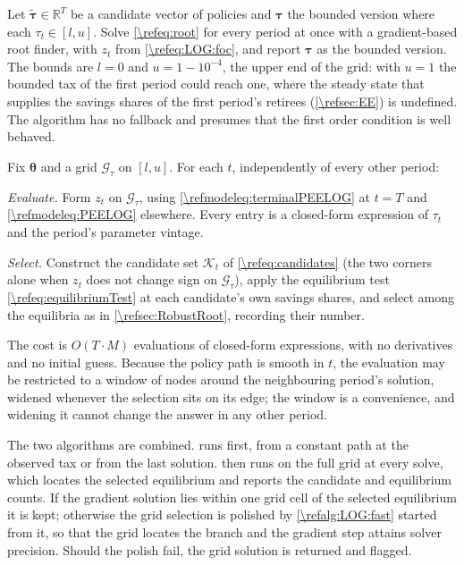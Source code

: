\begin{alg}
\label{\refalg:LOG:fast}
Let $\tilde{\bm{\tau}} \in \mathbb{R}^{T}$ be a candidate vector of policies and $\bm{\tau}$ the bounded version where each $\tau_t \in [l, u]$. Solve \eqref{\refeq:root} for every period at once with a gradient-based root finder, with $z_t$ from \eqref{\refeq:LOG:foc}, and report $\bm{\tau}$ as the bounded version. The bounds are $l = 0$ and $u = 1-10^{-4}$, the upper end of the grid: with $u = 1$ the bounded tax of the first period could reach one, where the steady state that supplies the savings shares of the first period's retirees (\cref{\refsec:EE}) is undefined. The algorithm has no fallback and presumes that the first order condition is well behaved.
\end{alg}

\begin{alg}\label{\refalg:LOG:gridsearch}
Fix $\bm{\theta}$ and a grid $\mathcal{G}_{\tau}$ on $[l,u]$. For each $t$, independently of every other period:

\smallskip\noindent\emph{Evaluate.} Form $z_t$ on $\mathcal{G}_{\tau}$, using \eqref{\refmodeleq:terminalPEELOG} at $t=T$ and \eqref{\refmodeleq:PEELOG} elsewhere. Every entry is a closed-form expression of $\tau_t$ and the period's parameter vintage.

\smallskip\noindent\emph{Select.} Construct the candidate set $\mathcal{K}_t$ of \eqref{\refeq:candidates} (the two corners alone when $z_t$ does not change sign on $\mathcal{G}_{\tau}$), apply the equilibrium test \eqref{\refeq:equilibriumTest} at each candidate's own savings shares, and select among the equilibria as in \cref{\refsec:RobustRoot}, recording their number.

\smallskip
The cost is $O(T\cdot M)$ evaluations of closed-form expressions, with no derivatives and no initial guess. Because the policy path is smooth in $t$, the evaluation may be restricted to a window of nodes around the neighbouring period's solution, widened whenever the selection sits on its edge; the window is a convenience, and widening it cannot change the answer in any other period.
\end{alg}

The two algorithms are combined.  runs first, from a constant path at the observed tax or from the last solution.  then runs on the full grid at every solve, which locates the selected equilibrium and reports the candidate and equilibrium counts. If the gradient solution lies within one grid cell of the selected equilibrium it is kept; otherwise the grid selection is polished by \cref{\refalg:LOG:fast} started from it, so that the grid locates the branch and the gradient step attains solver precision. Should the polish fail, the grid solution is returned and flagged.
